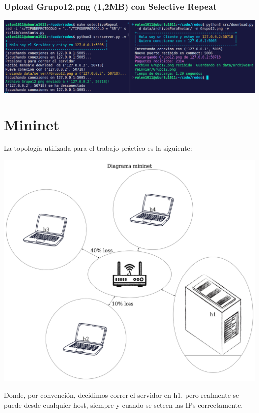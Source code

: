 \documentclass{article}
\begin{document}
\subsubsection{Upload Grupo12.png (1,2MB) con Selective Repeat}
\begin{center}
\includegraphics[scale=0.35]{DownloadGrupo12.png(1,2MB)conSelectiveRepeat}
\end{center}


\section{\texorpdfstring{\textbf{Mininet}}{Mininet}}\label{mininet}

La topología utilizada para el trabajo práctico es la siguiente:

\begin{center}
\includegraphics[scale=0.09999999999]{diagramaMininet}
\end{center}

Donde, por convención, decidimos correr el servidor en h1, pero realmente se puede desde cualquier host, siempre y cuando se seteen las IPs correctamente.
\end{document}
